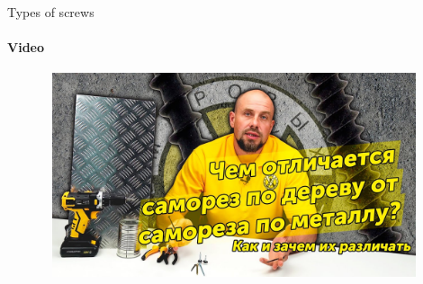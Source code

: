 \documentclass[aspectratio=169]{beamer}
\begin{document}
\begin{frame}[t]{Types of screws}
    \framesubtitle{Video}
    \vspace{-0.6cm}
    \begin{figure}[H]
        \href{https://youtu.be/Pe34Y-5LR9I}{
            \centering\includegraphics[height=6cm,width=1\textwidth,keepaspectratio]{types_of_screws_video.jpg}}
        \label{fig:types_of_screws_video.jpg}
    \end{figure}
\end{frame}
\end{document}
